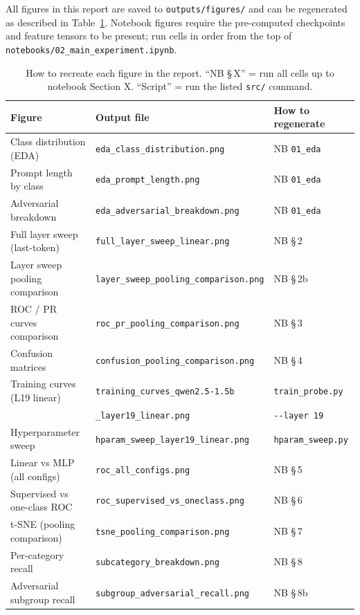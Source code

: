 \documentclass[11pt,a4paper]{article}
\begin{document}
All figures in this report are saved to \texttt{outputs/figures/} and can be
regenerated as described in Table~\ref{tab:figures}.
Notebook figures require the pre-computed checkpoints and feature tensors to be
present; run cells in order from the top of
\texttt{notebooks/02\_main\_experiment.ipynb}.

\begin{table}[H]
\centering
\caption{How to recreate each figure in the report.
         ``NB \S\,X'' = run all cells up to notebook Section X.
         ``Script'' = run the listed \texttt{src/} command.}
\label{tab:figures}
{\small
\begin{tabular}{p{4.8cm}p{5.8cm}p{3.6cm}}
\toprule
\textbf{Figure} & \textbf{Output file} & \textbf{How to regenerate} \\
\midrule
Class distribution (EDA)        & \texttt{eda\_class\_distribution.png}          & NB \texttt{01\_eda} \\
Prompt length by class          & \texttt{eda\_prompt\_length.png}               & NB \texttt{01\_eda} \\
Adversarial breakdown           & \texttt{eda\_adversarial\_breakdown.png}       & NB \texttt{01\_eda} \\
\midrule
Full layer sweep (last-token)   & \texttt{full\_layer\_sweep\_linear.png}        & NB \S\,2 \\
Layer sweep pooling comparison  & \texttt{layer\_sweep\_pooling\_comparison.png} & NB \S\,2b \\
ROC / PR curves comparison      & \texttt{roc\_pr\_pooling\_comparison.png}      & NB \S\,3 \\
Confusion matrices              & \texttt{confusion\_pooling\_comparison.png}    & NB \S\,4 \\
Training curves (L19 linear)    & \texttt{training\_curves\_qwen2.5-1.5b}        & \texttt{train\_probe.py} \\
                                & \texttt{\_layer19\_linear.png}                 & \texttt{-{}-layer 19} \\
Hyperparameter sweep            & \texttt{hparam\_sweep\_layer19\_linear.png}    & \texttt{hparam\_sweep.py} \\
Linear vs MLP (all configs)     & \texttt{roc\_all\_configs.png}                 & NB \S\,5 \\
Supervised vs one-class ROC     & \texttt{roc\_supervised\_vs\_oneclass.png}     & NB \S\,6 \\
t-SNE (pooling comparison)      & \texttt{tsne\_pooling\_comparison.png}         & NB \S\,7 \\
Per-category recall             & \texttt{subcategory\_breakdown.png}            & NB \S\,8 \\
Adversarial subgroup recall     & \texttt{subgroup\_adversarial\_recall.png}     & NB \S\,8b \\
\bottomrule
\end{tabular}}
\end{table}
\end{document}
